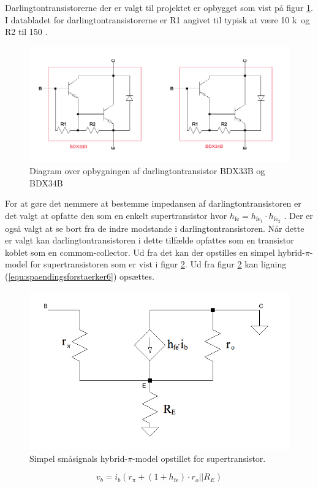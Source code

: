 Darlingtontransistorerne der er valgt til projektet er opbygget som vist på figur \ref{darlington_diagram}. I databladet for darlingtontransistorerne \cite{bdx33-34-datablad} er R1 angivet til typisk at være 10 k\ohm~og R2 til 150 \ohm.

\begin{figure}[h]
\centering
\includegraphics[scale = 0.4]{teknisk/effektforstaerker/darlingtontransistor_opbygning.png}
\caption{Diagram over opbygningen af darlingtontransistor BDX33B og BDX34B}
\label{darlington_diagram}
\end{figure}

For at gøre det nemmere at bestemme impedansen af darlingtontransistoren er det valgt at opfatte den som en enkelt supertransistor hvor $h_{\mathrm{fe}}= h_{\mathrm{fe}_1} \cdot h_{\mathrm{fe}_2}$ \cite{sedra-smith}. %
Der er også valgt at se bort fra de indre modstande i darlingtontransistoren. Når dette er valgt kan darlingtontransistoren i dette tilfælde opfattes som en transistor koblet som en commom-collector. Ud fra det kan der opstilles en simpel hybrid-$\pi$-model for supertransistoren som er vist i figur \ref{hybridpimodel_darlington}. Ud fra figur \ref{hybridpimodel_darlington} kan ligning (\ref{equ:spaendingsforstaerker6}) opsættes.

\begin{figure}[h]
\centering
\includegraphics[scale=0.3]{teknisk/effektforstaerker/hybridpimodel.png}
\caption{Simpel småsignals hybrid-$\pi$-model  opstillet for supertransistor.}
\label{hybridpimodel_darlington}
\end{figure}
\begin{equation}
\label{equ:spaendingsforstaerker6}
v_b = i_b (r_{\pi} + (1+h_{\mathrm{fe}}) \cdot r_o||R_E) 
\end{equation}

